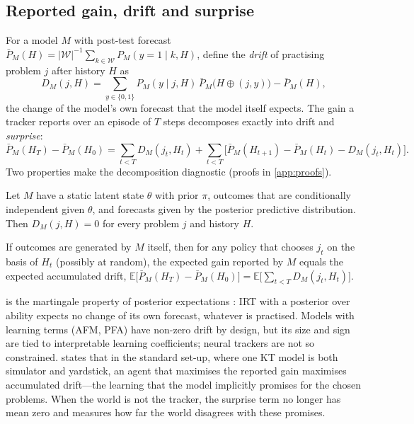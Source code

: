 \subsection{Reported gain, drift and surprise}\label{sec:drift}

For a model $M$ with post-test forecast $\bar P_M(H)=|\mathcal W|^{-1}\sum_{k\in\mathcal W}P_M(y=1\mid k,H)$, define the \emph{drift} of practising problem $j$ after history $H$ as
\begin{equation}
D_M(j,H) = \sum_{y\in\{0,1\}} P_M(y\mid j,H)\,\bar P_M\bigl(H\oplus(j,y)\bigr) - \bar P_M(H),
\label{eq:drift}
\end{equation}
the change of the model's own forecast that the model itself expects. The gain a tracker reports over an episode of $T$ steps decomposes exactly into drift and \emph{surprise}:
\begin{equation}
\bar P_M(H_{T}) - \bar P_M(H_0) = \sum_{t<T} D_M(j_t,H_t) + \sum_{t<T} \bigl[\bar P_M(H_{t+1}) - \bar P_M(H_t) - D_M(j_t,H_t)\bigr].
\label{eq:decomposition}
\end{equation}
Two properties make the decomposition diagnostic (proofs in \ref{app:proofs}).

\begin{proposition}\label{prop:nodrift}
Let $M$ have a static latent state $\theta$ with prior $\pi$, outcomes that are conditionally independent given $\theta$, and forecasts given by the posterior predictive distribution. Then $D_M(j,H)=0$ for every problem $j$ and history $H$.
\end{proposition}

\begin{proposition}\label{prop:insim}
If outcomes are generated by $M$ itself, then for any policy that chooses $j_t$ on the basis of $H_t$ (possibly at random), the expected gain reported by $M$ equals the expected accumulated drift, $\mathbb E\bigl[\bar P_M(H_T)-\bar P_M(H_0)\bigr] = \mathbb E\bigl[\sum_{t<T} D_M(j_t,H_t)\bigr]$.
\end{proposition}

 is the martingale property of posterior expectations \citep{williams1991probability}: IRT with a posterior over ability expects no change of its own forecast, whatever is practised. Models with learning terms (AFM, PFA) have non-zero drift by design, but its size and sign are tied to interpretable learning coefficients; neural trackers are not so constrained.  states that in the standard set-up, where one KT model is both simulator and yardstick, an agent that maximises the reported gain maximises accumulated drift---the learning that the model implicitly promises for the chosen problems. When the world is not the tracker, the surprise term no longer has mean zero and measures how far the world disagrees with these promises.

